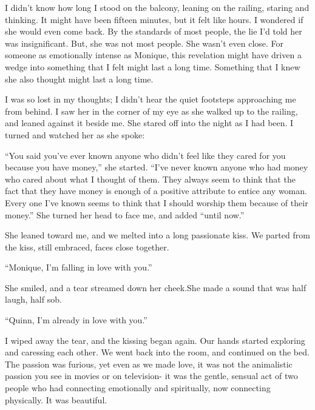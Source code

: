 I didn't know how long I stood on the balcony, leaning on the railing, staring and
thinking. It might have been fifteen minutes, but it felt like hours. I wondered if she would
even come back. By the standards of most people, the lie I'd told her was insignificant. But,
she was not most people. She wasn't even close. For someone as emotionally intense as Monique,
this revelation might have driven a wedge into something that I felt might last a long time.
Something that I knew she also thought might last a long time.

I was so lost in my thoughts; I didn't hear the quiet footsteps approaching me from behind.
I saw her in the corner of my eye as she walked up to the railing, and leaned against it beside
me. She stared off into the night as I had been. I turned and watched her as she spoke:

``You said you've ever known anyone who didn't feel like they cared for you because you have
money,'' she started. ``I've never known anyone who had money who cared about what I thought of
them. They always seem to think that the fact that they have money is enough of a positive
attribute to entice any woman. Every one I've known seems to think that I should worship them
because of their money.'' She turned her head to face me, and added ``until now.''

She leaned toward me, and we melted into a long passionate kiss. We parted from the kiss,
still embraced, faces close together.

``Monique, I'm falling in love with you.''

She smiled, and a tear streamed down her cheek.She made a sound that was half laugh, half
sob.

``Quinn, I'm already in love with you.''

I wiped away the tear, and the kissing began again. Our hands started exploring and
caressing each other. We went back into the room, and continued on the bed. The passion was
furious, yet even as we made love, it was not the animalistic passion you see in movies or on
television- it was the gentle, sensual act of two people who had connecting emotionally and
spiritually, now connecting physically. It was beautiful.

